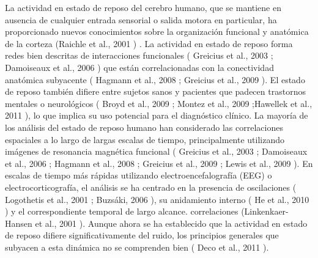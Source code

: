 La actividad en estado de reposo del cerebro humano, que se mantiene en ausencia de cualquier entrada sensorial o salida motora en particular, ha proporcionado nuevos conocimientos sobre la organización funcional y anatómica de la corteza (Raichle et al., 2001 ) . La actividad en estado de reposo forma redes bien descritas de interacciones funcionales ( Greicius et al., 2003 ; Damoiseaux et al., 2006 ) que están correlacionadas con la conectividad anatómica subyacente ( Hagmann et al., 2008 ; Greicius et al., 2009 ). El estado de reposo también difiere entre sujetos sanos y pacientes que padecen trastornos mentales o neurológicos ( Broyd et al., 2009 ; Montez et al., 2009 ;Hawellek et al., 2011 ), lo que implica su uso potencial para el diagnóstico clínico. La mayoría de los análisis del estado de reposo humano han considerado las correlaciones espaciales a lo largo de largas escalas de tiempo, principalmente utilizando imágenes de resonancia magnética funcional ( Greicius et al., 2003 ; Damoiseaux et al., 2006 ; Hagmann et al., 2008 ; Greicius et al., 2009 ; Lewis et al., 2009 ). En escalas de tiempo más rápidas utilizando electroencefalografía (EEG) o electrocorticografía, el análisis se ha centrado en la presencia de oscilaciones ( Logothetis et al., 2001 ; Buzsáki, 2006 ), su anidamiento interno ( He et al., 2010 ) y el correspondiente temporal de largo alcance. correlaciones (Linkenkaer-Hansen et al., 2001 ). Aunque ahora se ha establecido que la actividad en estado de reposo difiere significativamente del ruido, los principios generales que subyacen a esta dinámica no se comprenden bien ( Deco et al., 2011 ).



